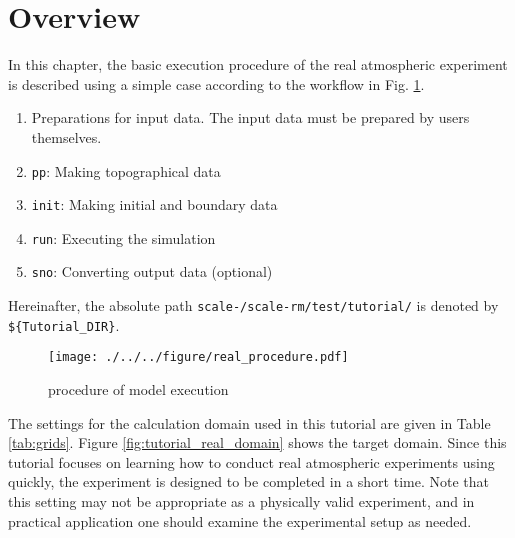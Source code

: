 \section{Overview} \label{sec:tutorial_real_intro}
In this chapter, the basic execution procedure of the real atmospheric experiment is described using a simple case according to the workflow in Fig. \ref{fig:howto}.
\begin{enumerate}
\item Preparations for input data. The input data must be prepared by users themselves.
\item \texttt{pp}:   Making topographical data
\item \texttt{init}: Making initial and boundary data
\item \texttt{run}:  Executing the simulation
\item \texttt{sno}:  Converting {\netcdf} output data (optional)
\end{enumerate}
Hereinafter, the absolute path \texttt{scale-{\version}/scale-rm/test/tutorial/} is denoted by\\
\verb|${Tutorial_DIR}|.

\begin{figure}[tb]
\begin{center}
  \texttt{[image: ./../../figure/real\_procedure.pdf]}\\
  \caption{\scalerm procedure of model execution}
  \label{fig:howto}
\end{center}
\end{figure}

The settings for the calculation domain used in this tutorial are given in Table \ref{tab:grids}.
Figure \ref{fig:tutorial_real_domain} shows the target domain.
Since this tutorial focuses on learning how to conduct 
real atmospheric experiments using \scalerm quickly,
the experiment is designed to be completed in a short time.
Note that this setting may not be appropriate as a physically valid experiment, 
and in practical application one should examine the experimental setup as needed.

